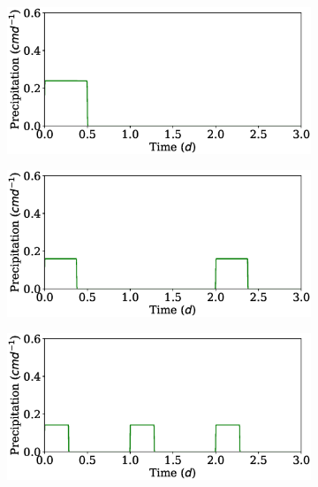 \documentclass[11pt,a4paper]{article}
\numberwithin{equation}{section}
\begin{document}
\begin{figure}
	\centering
	\begin{subfigure}{0.32\textwidth}
		\includegraphics[width = \linewidth, keepaspectratio] {pr_ppat1ptot0_12.eps}
		\caption{}
	\end{subfigure}
	\begin{subfigure}{0.32\textwidth}
		\includegraphics[width = \linewidth, keepaspectratio] {pr_ppat2ptot0_12.eps}
		\caption{}
	\end{subfigure}
	\begin{subfigure}{0.32\textwidth}
		\includegraphics[width = \linewidth, keepaspectratio] {pr_ppat3ptot0_12.eps}
		\caption{}
	\end{subfigure}\\

\end{figure}
\end{document}
